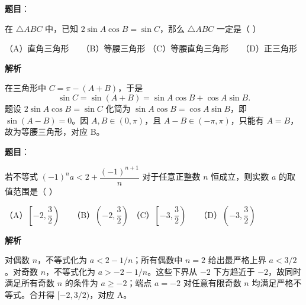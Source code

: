 \begin{answer}

\textbf{题目}：

在 $\triangle ABC$ 中，已知 $2\sin A\cos B=\sin C$，那么 $\triangle ABC$ 一定是（ ）

（A）直角三角形　　（B）等腰三角形
（C）等腰直角三角形　　（D）正三角形

\textbf{解析}

在三角形中 $C=\pi-(A+B)$，于是
\nopagebreak[4]
\[\sin C=\sin(A+B)=\sin A\cos B+\cos A\sin B.\]
题设 $2\sin A\cos B=\sin C$ 化简为 $\sin A\cos B=\cos A\sin B$，即 $\sin(A-B)=0$。因 $A,B\in(0,\pi)$，且 $A-B\in(-\pi,\pi)$，只能有 $A=B$，故为等腰三角形，对应 B。


\end{answer}
\begin{answer}

\textbf{题目}：

若不等式 $(-1)^n a<2+\dfrac{(-1)^{n+1}}{n}$ 对于任意正整数 $n$ 恒成立，则实数 $a$ 的取值范围是（ ）

（A）$\left[-2,\dfrac32\right)$　　（B）$\left(-2,\dfrac32\right)$
（C）$\left[-3,\dfrac32\right)$　　（D）$\left(-3,\dfrac32\right)$

\textbf{解析}

对偶数 $n$，不等式化为 $a<2-1/n$；所有偶数中 $n=2$ 给出最严格上界 $a<3/2$。对奇数 $n$，不等式化为 $a>-2-1/n$。这些下界从 $-2$ 下方趋近于 $-2$，故同时满足所有奇数 $n$ 的条件为 $a\ge-2$；端点 $a=-2$ 对任意有限奇数 $n$ 均满足严格不等式。合并得 $[-2,3/2)$，对应 A。

\gkanswer{答案：A，$a\in[-2,\frac32)$}

\end{answer}

